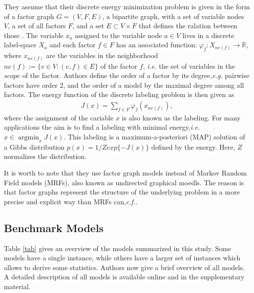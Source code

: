 \documentclass[10pt,twocolumn,letterpaper]{article}
\begin{document}
They assume that their discrete energy minimization problem is given in the form of a factor graph $G = (V,F,E)$, a bipartite graph, with a set of variable nodes $V$, a set of all factors $F$, and a set $E \subset V \times F$ that defines the ralation between those \cite{Optimizing}. The variable $x_a$ assigned to the variable node $a \in V$ lives in a discrete label-space $X_a$ and each factor $f \in F$ has an associated function: $\varphi_f : X_{ne(f)} \to \mathbb{R}$, where $x_{ne(f)}$ are the variables in the neighborhood $ne(f) := \{v \in V : (v,f)\in E\}$ of the factor $f$, \emph{i.e.} the set of variables in the $scope$ of the factor. Authors define the order of a factor by its degree,\emph{e.g.} pairwise factors have order 2, and the order of a model by the maximal degree among all factors. The energy function of the discrete labeling problem is then given as\\
\begin{gather}
J(x) = \sum_{f\in F}\varphi_f(x_{ne(f)}),
\end{gather}
where the assignment of the cariable $x$ is also known as the labeling. For many applications the aim is to find a labeling with minimal energy,\emph{i.e.} $\hat{x}\in\mathop{\arg\min}_{x}J(x)$. This labeling is a maximum-a-posteriori (MAP) solution of a Gibbs distribution $p(x) = 1/Z exp\{-J(x)\}$ defined by the energy. Here, $Z$ normalizes the distribution.

It is worth to note that they use factor graph models instead of Markov Random Field models (MRFs), also known as undirected graphical moedls. The reason is that factor graphs represent the structure of the underlying problem in a more precise and explicit way than MRFs can,\emph{c.f.}\cite{Optimizing}.
\balance

\subsection{Benchmark Models}

Table \ref{tab} gives an overview of the models summarized in this study. Some models have a single instance, while others have a larger set of instances which allows to derive some statistics. Authors now give a brief overview of all models. A detailed description of all models is available online and in the supplementary material.

{\small


}
\end{document}
